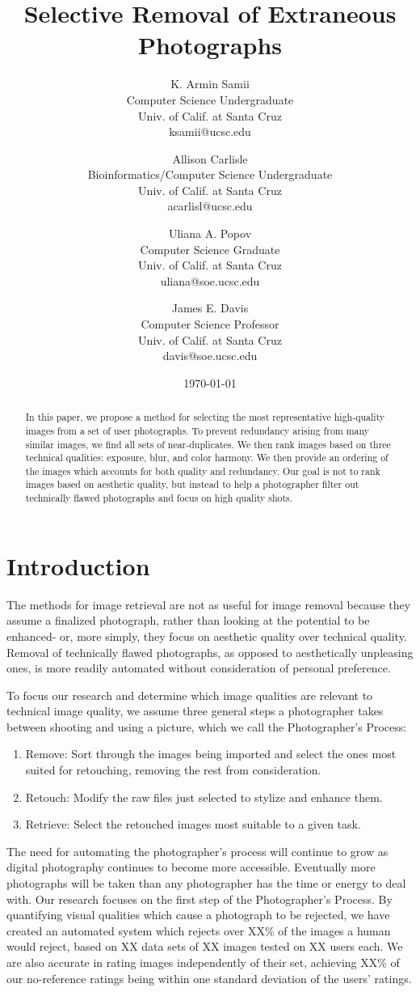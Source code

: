 \documentclass[twocolumn]{article}
\title{
Selective Removal of Extraneous Photographs
}
\author{
K. Armin Samii\\
Computer Science Undergraduate\\
Univ. of Calif. at Santa Cruz\\
ksamii@ucsc.edu
\and
Allison Carlisle\\
Bioinformatics/Computer Science Undergraduate\\
Univ. of Calif. at Santa Cruz\\
acarlisl@ucsc.edu
\and
Uliana A. Popov\\
Computer Science Graduate\\
Univ. of Calif. at Santa Cruz\\
uliana@soe.ucsc.edu
\and
James E. Davis\\
Computer Science Professor\\
Univ. of Calif. at Santa Cruz\\
davis@soe.ucsc.edu
}
\date{\today}
\begin{document}
\maketitle
\begin{abstract}
In this paper, we propose a method for selecting the most representative high-quality images from a set of user photographs. To prevent redundancy arising from many similar images, we find all sets of near-duplicates. We then rank images based on three technical qualities: exposure, blur, and color harmony. We then provide an ordering of the images which accounts for both quality and redundancy. Our goal is not to rank images based on aesthetic quality, but instead to help a photographer filter out technically flawed photographs and focus on high quality shots.
\end{abstract}

\section{Introduction}
The methods for image retrieval are not as useful for image removal because they assume a finalized photograph, rather than looking at the potential to be enhanced- or, more simply, they focus on aesthetic quality over technical quality. Removal of technically flawed photographs, as opposed to aesthetically unpleasing ones, is more readily automated without consideration of personal preference.

To focus our research and determine which image qualities are relevant to technical image quality, we assume three general steps a photographer takes between shooting and using a picture, which we call the Photographer's Process:
\begin{enumerate}
\item Remove: Sort through the images being imported and select the ones most suited for retouching, removing the rest from consideration.
\item Retouch: Modify the raw files just selected to stylize and enhance them.
\item Retrieve: Select the retouched images most suitable to a given task.
\end{enumerate}
The need for automating the photographer's process will continue to grow as digital photography continues to become more accessible.  Eventually more photographs will be taken than any photographer has the time or energy to deal with.  Our research focuses on the first step of the Photographer's Process. By quantifying visual qualities which cause a photograph to be rejected, we have created an automated system which rejects over XX\% of the images a human would reject, based on XX data sets of XX images tested on XX users each. We are also accurate in rating images independently of their set, achieving XX\% of our no-reference ratings being within one standard deviation of the users' ratings.
\end{document}
